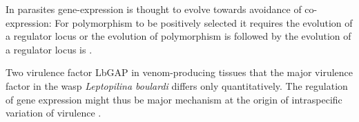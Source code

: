 In parasites gene-expression is thought to evolve towards avoidance of
co-expression: For polymorphism to be positively selected it requires
the evolution of a regulator locus or the evolution of polymorphism is
followed by the evolution of a regulator locus is \cite{pmid15913420}.

Two virulence factor LbGAP in venom-producing tissues that the major
virulence factor in the wasp \textit{Leptopilina boulardi} differs
only quantitatively. The regulation of gene expression might thus be
major mechanism at the origin of intraspecific variation of virulence
\cite{pmid21124871}.




     